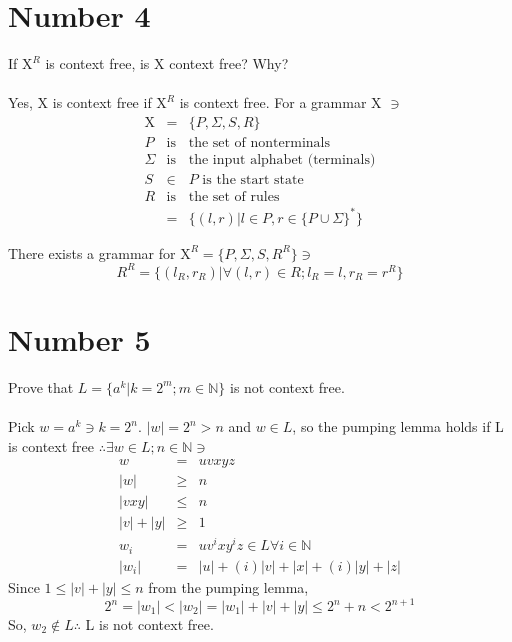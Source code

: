 \documentclass[12pt,a4paper,twoside]{article}  %
\begin{document}
\section{Number 4}

If $\textrm{X}^R$ is context free, is X context free?
Why?\\\\
Yes, X is context free if $\textrm{X}^R$ is context
free. For a grammar X $\ni$
\begin{eqnarray}
\textrm{X} &=& \{P, \Sigma, S, R\} \\
P          &\textrm{is}& \textrm{the set of nonterminals} \nonumber\\
\Sigma     &\textrm{is}& \textrm{the input alphabet (terminals)} \nonumber\\
S          &\in& P \textrm{ is the start state} \nonumber\\
R          &\textrm{is}& \textrm{the set of rules} \nonumber\\
           &=& \{(l, r) | l \in P, r \in \{P \cup \Sigma\}^*\}
\end{eqnarray}

There exists a grammar for $\textrm{X}^R = \{P, \Sigma, S, R^R\} \ni$
\begin{equation}
R^R = \{(l_R, r_R) | \forall (l, r) \in R; l_R = l, r_R = r^R\}
\end{equation}

\section{Number 5}

Prove that $L = \{a^k | k = 2^m; m \in \mathbb{N}\}$ is not context
free.\\\\
Pick $w = a^k \ni k = 2^n$. $|w| = 2^n > n$ and $w \in L$, so the
pumping lemma holds if L is context free $\therefore \exists w \in L;
n \in \mathbb{N} \ni$
\begin{eqnarray}
w         &=&    uvxyz \\
|w|       &\geq& n \\
|vxy|     &\leq& n \\
|v| + |y| &\geq& 1 \\
w_i       &=&    uv^ixy^iz \in L \forall i \in \mathbb{N} \\
|w_i|     &=& |u| + (i)|v| + |x| + (i)|y| + |z|
\end{eqnarray}
Since $1 \leq |v| + |y| \leq n$ from the pumping lemma,
\begin{equation}
2^n = |w_1| < |w_2| = |w_1| + |v| + |y| \leq 2^n + n < 2^{n + 1}
\end{equation}
So, $w_2 \not \in L \therefore$ L is not context free.
\end{document}
